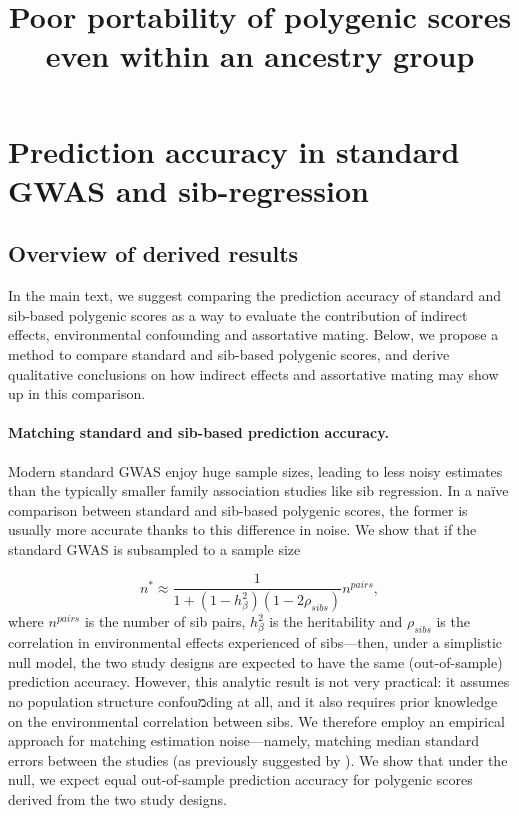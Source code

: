 \documentclass[hidelinks, 12pt]{article}
\title{Poor portability of polygenic scores even within an ancestry group}
\newcommand{\beginsupplement}{%
    \setcounter{table}{0}
    \renewcommand{\thetable}{S\arabic{table}}%
    \setcounter{figure}{0}
    \renewcommand{\thefigure}{S\arabic{figure}}%
}
\begin{document}
 
\baselineskip24pt

\maketitle 
\begin{center}
\end{center}
\clearpage

\begingroup
  \hypersetup{hidelinks}
  \tableofcontents
\endgroup

\listoffigures
\listoftables

\pagebreak

\beginsupplement

\section{Prediction accuracy in standard GWAS and sib-regression}
\subsection{Overview of derived results}
In the main text, we suggest comparing the prediction accuracy of standard and sib-based polygenic scores as a way to evaluate the contribution of indirect effects, environmental confounding and assortative mating.  Below, we propose a method to compare standard and sib-based polygenic scores, and derive qualitative conclusions on how indirect effects and assortative mating may show up in this comparison.  

\paragraph{Matching standard and sib-based prediction accuracy.} Modern standard GWAS enjoy huge sample sizes, leading to less noisy estimates than the typically smaller family association studies like sib regression.  In a na{\"i}ve comparison between standard and sib-based polygenic scores, the former is usually more accurate thanks to this difference in noise.  We show that if the standard GWAS is subsampled to a sample size 

$$n^* \approx \frac{1}{1+(1-h_{\beta}^2)(1-2\rho_{sibs})}n^{pairs},$$
where $n^{pairs}$ is the number of sib pairs, $h_{\beta}^2$ is the heritability and $\rho_{sibs}$ is the correlation in environmental effects experienced of sibs---then, under a simplistic null model, the two study designs are expected to have the same (out-of-sample) prediction accuracy.  However, this analytic result is not very practical: it assumes no population structure confouמding at all, and it also requires prior knowledge on the environmental correlation between sibs.  We therefore employ an empirical approach for matching estimation noise---namely, matching median standard errors between the studies (as previously suggested by \cite{wood2014defining}).  We show that under the null, we expect equal out-of-sample prediction accuracy for polygenic scores derived from the two study designs.  
\end{document}
